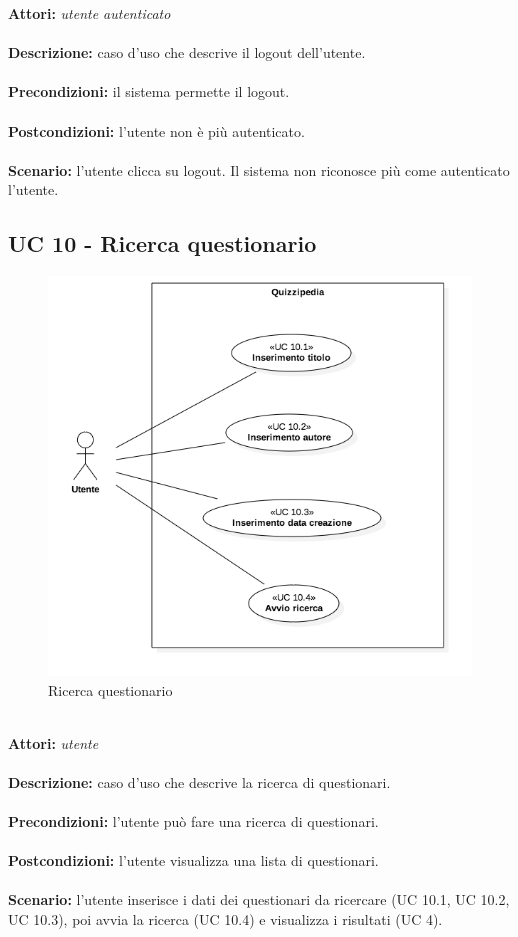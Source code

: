 \documentclass[a4paper,11pt]{article}
\begin{document}
\textbf{Attori:} \textit{utente autenticato}
\\ \\
\textbf{Descrizione:} caso d'uso che descrive il logout dell'utente.\\
\\
\textbf{Precondizioni:} il sistema permette il logout.\\
\\
\textbf{Postcondizioni:} l’utente non è più autenticato.\\
\\
\textbf{Scenario:} l’utente clicca su logout. Il sistema non riconosce più come autenticato l'utente.\\


\newpage
\subsection{UC 10 - Ricerca questionario}

\begin{figure}[h!]
\centering
\includegraphics[scale=0.60]{../immagini/UC10.png}
\caption{Ricerca questionario}
\end{figure}
\ \\
\textbf{Attori:} \textit{utente}
\\ \\
\textbf{Descrizione:} caso d'uso che descrive la ricerca di questionari.\\
\\
\textbf{Precondizioni:} l'utente può fare una ricerca di questionari.\\
\\
\textbf{Postcondizioni:} l’utente visualizza una lista di questionari.\\
\\
\textbf{Scenario:} l’utente inserisce i dati dei questionari da ricercare (UC 10.1, UC 10.2, UC 10.3), poi avvia la ricerca (UC 10.4) e visualizza i risultati (UC 4).\\
\end{document}
